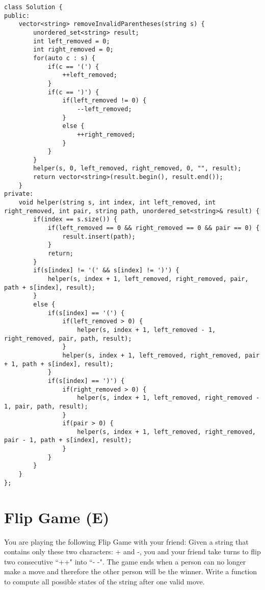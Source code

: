 \begin{lstlisting}
class Solution {
public:
    vector<string> removeInvalidParentheses(string s) {
        unordered_set<string> result;
        int left_removed = 0;
        int right_removed = 0;
        for(auto c : s) {
            if(c == '(') {
                ++left_removed;
            }
            if(c == ')') {
                if(left_removed != 0) {
                    --left_removed;
                }
                else {
                    ++right_removed;
                }
            }
        }
        helper(s, 0, left_removed, right_removed, 0, "", result);
        return vector<string>(result.begin(), result.end());
    }
private:
    void helper(string s, int index, int left_removed, int right_removed, int pair, string path, unordered_set<string>& result) {
        if(index == s.size()) {
            if(left_removed == 0 && right_removed == 0 && pair == 0) {
                result.insert(path);
            }
            return;
        }
        if(s[index] != '(' && s[index] != ')') {
            helper(s, index + 1, left_removed, right_removed, pair, path + s[index], result);
        }
        else {
            if(s[index] == '(') {
                if(left_removed > 0) {
                    helper(s, index + 1, left_removed - 1, right_removed, pair, path, result);
                }
                helper(s, index + 1, left_removed, right_removed, pair + 1, path + s[index], result);
            }
            if(s[index] == ')') {
                if(right_removed > 0) {
                    helper(s, index + 1, left_removed, right_removed - 1, pair, path, result);
                }
                if(pair > 0) {
                    helper(s, index + 1, left_removed, right_removed, pair - 1, path + s[index], result);
                }
            }
        }
    }
};
\end{lstlisting}


\section{Flip Game (E)}
You are playing the following Flip Game with your friend: Given a string that contains only these two characters: + and -, you and your friend take turns to flip two consecutive ``++" into ``- -". The game ends when a person can no longer make a move and therefore the other person will be the winner. Write a function to compute all possible states of the string after one valid move.\\

